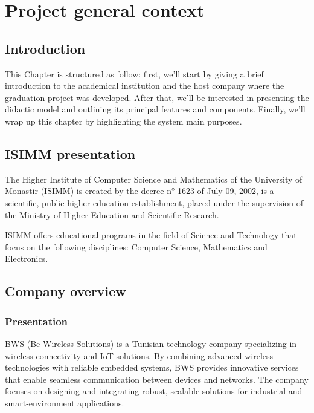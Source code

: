 \clearpage
\chapter{Project general context}
\pagestyle{fancy}
\fancyhf{}
\cfoot{\thepage}

\section{Introduction}
\hspace{1cm}This Chapter is structured as follow: first, we'll start by giving a brief introduction to the academical institution and the host company where the graduation project was developed. After that, we'll be interested in presenting the didactic model and outlining its principal features and components. Finally, we'll wrap up this chapter by highlighting the system main purposes.
\section{ISIMM presentation}
\hspace{1cm}The Higher Institute of Computer Science and Mathematics of the University of Monastir (ISIMM) is created by the decree n° 1623 of July 09, 2002, is a scientific, public higher education establishment, placed under the supervision of the Ministry of Higher Education and Scientific Research.

ISIMM offers educational programs in the field of Science and Technology that focus on the following disciplines: Computer Science, Mathematics and Electronics\cite{0}.

\section{Company overview}

\subsection{Presentation}
\hspace{1cm}
BWS (Be Wireless Solutions) is a Tunisian technology company specializing in wireless connectivity and IoT solutions. By combining advanced wireless technologies with reliable embedded systems, BWS provides innovative services that enable seamless communication between devices and networks. The company focuses on designing and integrating robust, scalable solutions for industrial and smart‑environment applications\cite{1}.

